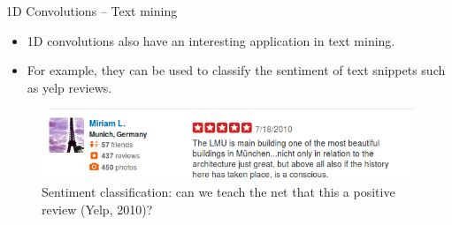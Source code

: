\begin{vbframe}{1D Convolutions -- Text mining}
    \begin{itemize}
        \item 1D convolutions also have an interesting application in text mining.
        \item For example, they can be used to classify the sentiment of text snippets such as yelp reviews.
    \end{itemize}
    \begin{figure}
        \centering
        \includegraphics[width=12cm]{plots/05_conv_variations/1d/yelp_lmu.png}
        \caption{Sentiment classification: can we teach the net that this a positive review (Yelp, 2010)?}
    \end{figure}
\end{vbframe}

